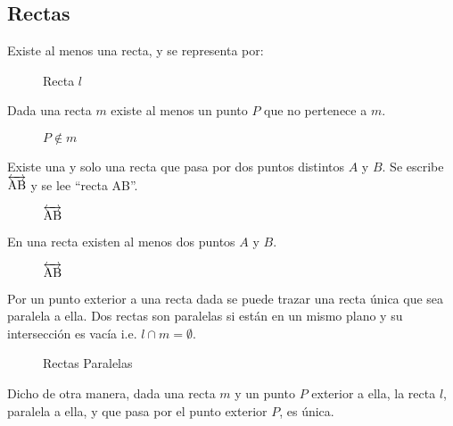 \subsection{Rectas}

\begin{postulate}
    Existe al menos una recta, y se representa por:
    
    \begin{figure}[h]
        \centering
        
        \caption{Recta $l$}
        \label{fig:plot1}
    \end{figure}
\end{postulate}

\begin{postulate}
    Dada una recta $m$ existe al menos un punto $P$ que no pertenece a $m$.
    
    \begin{figure}[h]
        \centering
        
        \caption{$P \notin m$}
        \label{fig:plot2}
    \end{figure}
\end{postulate}

\begin{postulate}
    Existe una y solo una recta que pasa por dos puntos distintos $A$ y $B$. Se escribe $\overleftrightarrow{\rm AB}$ y se lee ``recta AB''. 
    
    \begin{figure}[h]
        \centering
        
        \caption{$\overleftrightarrow{\rm AB}$}
        \label{fig:plot3}
    \end{figure}
\end{postulate}

\begin{postulate}
    En una recta existen al menos dos puntos $A$ y $B$.
    
    \begin{figure}[!h]
        \centering
        
        \caption{$\overleftrightarrow{\rm AB}$}
        \label{fig:plot4}
    \end{figure}
\end{postulate}

\begin{postulate}
    Por un punto exterior a una recta dada se puede trazar una recta única que sea paralela a ella. Dos rectas son paralelas si están en un mismo plano y su intersección es vacía i.e. $l \cap m = \emptyset$.
    
    \begin{figure}[!h]
        \centering
        
        \caption{Rectas Paralelas}
        \label{fig:plot15}
    \end{figure}

    Dicho de otra manera, dada una recta $m$ y un punto $P$ exterior a ella, la recta $l$, paralela a ella, y que pasa por el punto exterior $P$, es única.
    
\end{postulate}

